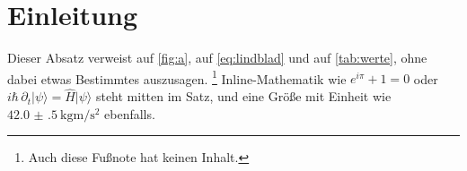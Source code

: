 \section{Einleitung}

\blindtext

Dieser Absatz verweist auf \cref{fig:a}, auf \cref{eq:lindblad} und auf
\cref{tab:werte}, ohne dabei etwas Bestimmtes auszusagen.%
\footnote{Auch diese Fußnote hat keinen Inhalt.}
Inline-Mathematik wie $e^{i\pi} + 1 = 0$ oder
$i\hbar\,\partial_t \lvert\psi\rangle = \hat H \lvert\psi\rangle$ steht
mitten im Satz, und eine Größe mit Einheit wie
$\qty{42.0(5)}{\kilo\gram\metre\per\second\squared}$ ebenfalls.

\blindtext
